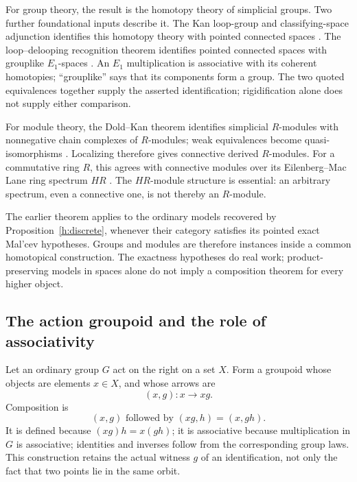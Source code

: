 For group theory, the result is the homotopy theory of simplicial groups.
Two further foundational inputs describe it. The Kan loop-group and
classifying-space adjunction identifies this homotopy theory with pointed
connected spaces \cite[Chapter V, Proposition 6.3 and Corollary 6.4]{GoerssJardine}.
The loop--delooping recognition theorem identifies pointed connected spaces
with grouplike $E_1$-spaces \cite[Theorem 5.2.6.10]{HA}.
An $E_1$ multiplication is associative with its coherent homotopies;
``grouplike'' says that its components form a group. The two quoted
equivalences together supply the asserted identification; rigidification
alone does not supply either comparison.

For module theory, the Dold--Kan theorem identifies simplicial $R$-modules
with nonnegative chain complexes of $R$-modules; weak equivalences become
quasi-isomorphisms \cite[Tag 019G]{Stacks}.  Localizing therefore gives
connective derived $R$-modules.  For a commutative ring $R$, this agrees
with connective modules over its Eilenberg--Mac Lane ring spectrum $HR$
\cite[Theorem 7.1.2.13]{HA}.  The $HR$-module structure is essential:
an arbitrary spectrum, even a connective one, is not thereby an
$R$-module.

The earlier theorem applies to the ordinary models recovered by
Proposition~\ref{h:discrete}, whenever their category satisfies its pointed
exact Mal'cev hypotheses.  Groups and modules are therefore instances
inside a common homotopical construction.  The exactness hypotheses do
real work; product-preserving models in spaces alone do not imply a
composition theorem for every higher object.

\subsection{The action groupoid and the role of associativity}

Let an ordinary group $G$ act on the right on a set $X$.  Form a groupoid
whose objects are elements $x\in X$, and whose arrows are
\[
 (x,g):x\longrightarrow xg.
\]
Composition is
\[
 (x,g)\text{ followed by }(xg,h)=(x,gh).
\]
It is defined because $(xg)h=x(gh)$; it is associative because multiplication
in $G$ is associative; identities and inverses follow from the corresponding
group laws.  This construction retains the actual witness $g$ of an
identification, not only the fact that two points lie in the same orbit.

